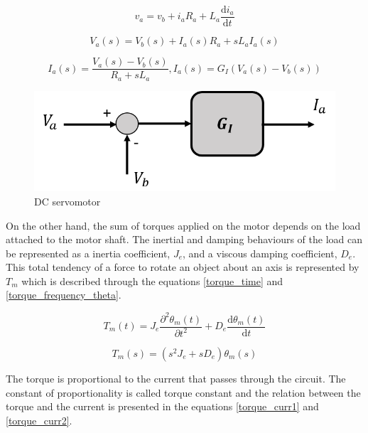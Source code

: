 \begin{equation}\label{DC_servomotor_equation1}
v_{a}= v_{b}+i_{a} R_{a}+L_{a}\frac{\mathrm{d} i_{a}}{\mathrm{d} t}
\end{equation}

\begin{equation}\label{DC_servomotor_equation2}
V_{a}(s)= V_{b}(s)+I_{a}(s) R_{a}+sL_{a}I_{a}(s)
\end{equation}

\begin{equation}\label{DC_servomotor_equation3}
I_{a}(s)= \frac{V_{a}(s)-V_{b}(s)}{R_{a}+sL_{a}} , I_{a}(s)= G_{I}(V_{a}(s)-V_{b}(s))
\end{equation}

\begin{figure}[H]
\centering
\includegraphics[scale=0.6]{figures/model1.png}
\caption{DC servomotor}
\label{model1}
\end{figure}

On the other hand, the sum of torques applied on the motor depends on the load attached to the motor shaft. The inertial and damping behaviours of the load can be represented as a inertia coefficient, $J_{e}$, and a viscous damping coefficient, $D_{e}$. This total tendency of a force to rotate an object about an axis is represented by $T_{m}$ which is described through the equations \ref{torque_time} and \ref{torque_frequency_theta}.

\begin{equation}\label{torque_time}
T_{m}(t)= J_{e}\frac{\partial^2 \theta_{m}(t)}{\partial t^2}+D_{e}\frac{\mathrm{d} \theta_{m}(t)}{\mathrm{d} t}
\end{equation}

\begin{equation}\label{torque_frequency_theta}
T_{m}(s)= (s^{2}J_{e} + sD_{e})\theta_{m}(s)
\end{equation}

The torque is proportional to the current that passes through the circuit. The constant of proportionality is called torque constant and the relation between the torque and the current is presented in the equations \ref{torque_curr1} and \ref{torque_curr2}. 

